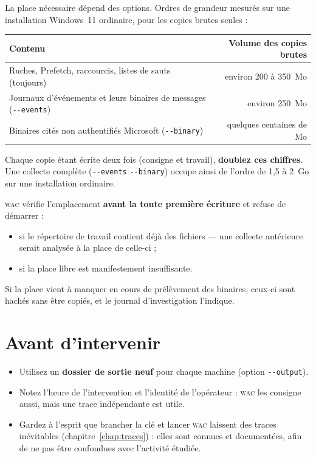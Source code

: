 \documentclass[11pt,a4paper,oneside]{report}
\newcommand{\wac}{\textsc{wac}}
\newcommand{\opt}[1]{\texttt{-{}-#1}}
\begin{document}
La place nécessaire dépend des options. Ordres de grandeur mesurés sur une
installation Windows~11 ordinaire, pour les copies brutes seules :

\begin{center}
\begin{tabular}{@{}L{9.6cm}r@{}}
\toprule
Contenu & Volume des copies brutes \\
\midrule
Ruches, Prefetch, raccourcis, listes de sauts (toujours) & environ 200 à 350~Mo \\
Journaux d'événements et leurs binaires de messages (\opt{events}) & environ 250~Mo \\
Binaires cités non authentifiés Microsoft (\opt{binary}) & quelques centaines de Mo \\
\bottomrule
\end{tabular}
\end{center}

Chaque copie étant écrite deux fois (consigne et travail), \textbf{doublez ces
chiffres}. Une collecte complète (\opt{events} \opt{binary}) occupe ainsi de
l'ordre de 1,5 à 2~Go sur une installation ordinaire.

\wac{} vérifie l'emplacement \textbf{avant la toute première écriture} et refuse
de démarrer :
\begin{itemize}
  \item si le répertoire de travail contient déjà des fichiers — une collecte
        antérieure serait analysée à la place de celle-ci ;
  \item si la place libre est manifestement insuffisante.
\end{itemize}
Si la place vient à manquer en cours de prélèvement des binaires, ceux-ci sont
hachés sans être copiés, et le journal d'investigation l'indique.

\section{Avant d'intervenir}

\begin{itemize}
  \item Utilisez un \textbf{dossier de sortie neuf} pour chaque machine
        (option \opt{output}).
  \item Notez l'heure de l'intervention et l'identité de l'opérateur : \wac{} les
        consigne aussi, mais une trace indépendante est utile.
  \item Gardez à l'esprit que brancher la clé et lancer \wac{} laissent des traces
        inévitables (chapitre~\ref{chap:traces}) : elles sont connues et
        documentées, afin de ne pas être confondues avec l'activité étudiée.
\end{itemize}
\end{document}
